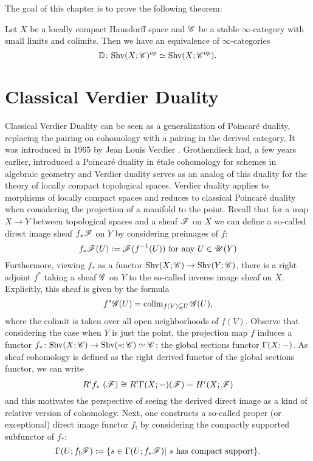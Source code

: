\documentclass[../../thesis.tex]{subfiles}
\begin{document}
The goal of this chapter is to prove the following theorem:
\begin{theorem}\label{VerdierDuality}
    Let $X$ be a locally compact Hausdorff space and $\mathscr{C}$ be a stable $\infty$-category with small limits and colimits.
    Then we have an equivalence of $\infty$-categories
    \[
        \mathbb{D} \colon \mathrm{Shv}(X;\mathscr{C})^{op} \simeq \mathrm{Shv}(X;\mathscr{C}^{op}).
    \]
\end{theorem}
\section{Classical Verdier Duality}
Classical Verdier Duality can be seen as a generalization of Poincaré duality, replacing the pairing on cohomology with a pairing in the derived category.
It was introduced in 1965 by Jean Louis Verdier \cite{Verdier95}.
Grothendieck had, a few years earlier, introduced a Poincaré duality in étale cohomology for schemes in algebraic geometry and Verdier duality serves as an analog of this duality for the theory of locally compact topological spaces.
Verdier duality applies to morphisms of locally compact spaces and reduces to classical Poincaré duality when considering the projection of a manifold to the point.
Recall that for a map $X \to Y$ between topological spaces and a sheaf $\mathscr{F}$ on $X$ we can define a so-called direct image sheaf $f_*\mathscr{F}$ on $Y$ by considering preimages of $f$:
\[
    f_*\mathscr{F}(U) : = \mathscr{F}(f^{-1}(U)) \text{ for any }  U \in \mathscr{U}(Y)
\]
Furthermore, viewing $f_*$ as a functor $\mathrm{Shv}(X;\mathscr{C}) \to \mathrm{Shv}(Y; \mathscr{C})$, there is a right adjoint $f^*$ taking a sheaf $\mathscr{G}$ on $Y$ to the so-called inverse image sheaf on $X$.
Explicitly, this sheaf is given by the formula
\[
    f^*\mathscr{G} (U) = \operatorname{colim}_{f(V) \subseteq U}\mathscr{G}(U) ,
\]
where the colimit is taken over all open neighborhoods of $f(V)$.
Observe that considering the case when $Y$ is just the point, the projection map $f$ induces a functor $f_* \colon \mathrm{Shv}(X;\mathscr{C}) \to \mathrm{Shv}(*; \mathscr{C}) \simeq \mathscr{C}$; the global sections functor $\Gamma(X; {-})$.
As sheaf cohomology is defined as the right derived functor of the global sections functor, we can write
\[
    R^i f_* (\F) \cong R^i\Gamma(X;\blank)(\F) = H^i(X; \F)
\]
and this motivates the perspective of seeing the derived direct image as a kind of relative version of cohomology.
Next, one constructs a so-called proper (or exceptional) direct image functor $f_!$ by considering the compactly supported subfunctor of $f_*$:
\[
    \Gamma(U; f_!\F) : = \{ s \in \Gamma(U; f_*\F) | s \text{ has compact support}\}.
\]
\end{document}
